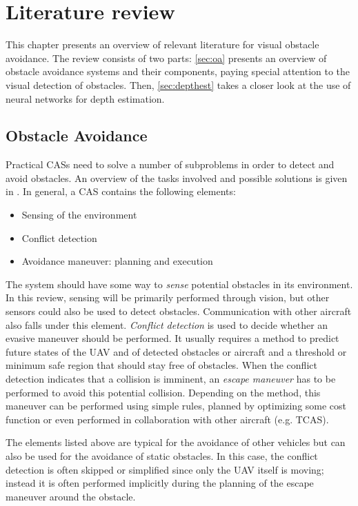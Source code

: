 \chapter{Literature review}
\label{sec:lit}
This chapter presents an overview of relevant literature for visual obstacle avoidance.
The review consists of two parts: \autoref{sec:oa} presents an overview of obstacle avoidance systems and their components, paying special attention to the visual detection of obstacles.
Then, \autoref{sec:depthest} takes a closer look at the use of neural networks for depth estimation.

\section{Obstacle Avoidance}
\label{sec:oa}
Practical \acfp{CAS} need to solve a number of subproblems in order to detect and avoid obstacles.
An overview of the tasks involved and possible solutions is given in \cite{Albaker2009,Pham2015}.
In general, a \ac{CAS} contains the following elements:
\begin{itemize}
\item Sensing of the environment
\item Conflict detection
\item Avoidance maneuver: planning and execution
\end{itemize}
The system should have some way to \emph{sense} potential obstacles in its environment.
In this review, sensing will be primarily performed through vision, but other sensors could also be used to detect obstacles.
Communication with other aircraft also falls under this element.
\emph{Conflict detection} is used to decide whether an evasive maneuver should be performed.
It usually requires a method to predict future states of the \ac{UAV} and of detected obstacles or aircraft and a threshold or minimum safe region that should stay free of obstacles.
When the conflict detection indicates that a collision is imminent, an \emph{escape maneuver} has to be performed to avoid this potential collision.
Depending on the method, this maneuver can be performed using simple rules, planned by optimizing some cost function or even performed in collaboration with other aircraft (e.g. \ac{TCAS}).

The elements listed above are typical for the avoidance of other vehicles but can also be used for the avoidance of static obstacles.
In this case, the conflict detection is often skipped or simplified since only the \ac{UAV} itself is moving; instead it is often performed implicitly during the planning of the escape maneuver around the obstacle.

